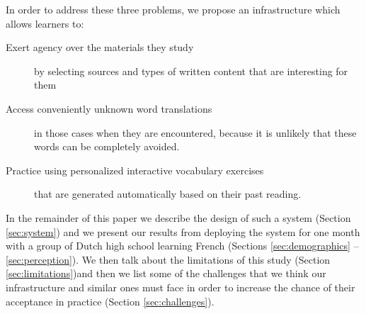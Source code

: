 In order to address these three problems, we propose an infrastructure which allows learners to: 

	\begin{description}
	
		\item [Exert agency over the materials they study] by selecting sources and types of written content that are interesting for them
	
		\item [Access conveniently unknown word translations] in those cases when they are encountered, because it is unlikely that these words can be completely avoided.

		\item [Practice using personalized interactive vocabulary exercises] that are generated automatically based on their past reading.

	\end{description}


In the remainder of this paper we describe the design of such a system (Section \ref{sec:system}) and we present our results from deploying the system for one month with a group of Dutch high school \students learning French (Sections \ref{sec:demographics} -- \ref{sec:perception}). We then talk about the limitations of this study (Section \ref{sec:limitations})and then we list some of the challenges that we think our infrastructure and similar ones must face in order to increase the chance of their acceptance in practice (Section \ref{sec:challenges}).


